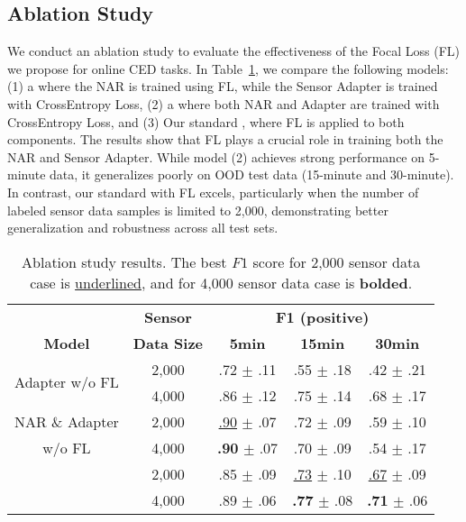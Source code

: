 \subsection{Ablation Study}
We conduct an ablation study to evaluate the effectiveness of the Focal Loss (FL) we propose for online CED tasks. In Table~\ref{tab:fl_ablation}, we compare the following models: (1) a \narce{} where the NAR is trained using FL, while the Sensor Adapter is trained with CrossEntropy Loss, (2) a \narce{} where both NAR and Adapter are trained with CrossEntropy Loss, and (3) Our standard \narce{}, where FL is applied to both components. The results show that FL plays a crucial role in training both the NAR and Sensor Adapter. While model (2) achieves strong performance on 5-minute data, it generalizes poorly on OOD test data (15-minute and 30-minute). In contrast, our standard \narce{} with FL excels, particularly when the number of labeled sensor data samples is limited to 2,000, demonstrating better generalization and robustness across all test sets.


\begin{table}[t]
    \centering
    \small
    \setlength{\tabcolsep}{3pt}
    \caption{Ablation study results. The best $F1$ score for 2,000 sensor data case is \underline{underlined}, and for 4,000 sensor data case is \textbf{bolded}.}
    \vskip 0.15in
    \begin{tabular}{c c c c c} %
        \toprule
         & \textbf{Sensor} & \multicolumn{3}{c}{\textbf{F1 (positive)}}\\
        \cmidrule(lr){3-5}
        \textbf{Model}& \textbf{Data Size} & \textbf{5min} & \textbf{15min} & \textbf{30min} \\
        \midrule
        \multirow{2}{*}{Adapter w/o FL} & 2,000 & .72 $\pm$ .11 & .55 $\pm$ .18 & .42 $\pm$ .21 \\ 
                               & 4,000 & .86 $\pm$ .12 & .75 $\pm$ .14 & .68 $\pm$ .17 \\
        \midrule
        NAR \& Adapter & 2,000 & \underline{.90} $\pm$ .07 & .72 $\pm$ .09 & .59 $\pm$ .10 \\
         w/o FL                       & 4,000 & \textbf{.90} $\pm$ .07 & .70 $\pm$ .09 & .54 $\pm$ .17 \\
        \midrule
        \multirow{2}{*}{\narce{}} & 2,000 & .85 $\pm$ .09 & \underline{.73} $\pm$ .10 & \underline{.67} $\pm$ .09\\
                               & 4,000 & .89 $\pm$ .06 & \textbf{.77} $\pm$ .08 & \textbf{.71} $\pm$ .06 \\
        \bottomrule
    \end{tabular}
    \label{tab:fl_ablation}
    \vskip -0.1in
    \vspace{-1em}
\end{table}

